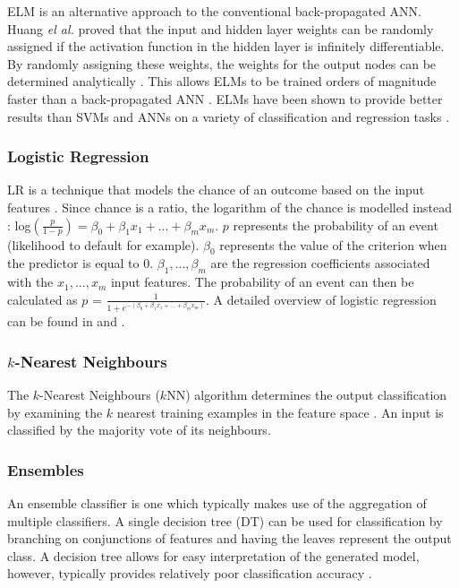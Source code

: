 \documentclass{sig-alternate-05-2015}
\begin{document}
	ELM is an alternative approach to the conventional back-propagated ANN. Huang \textit{el al.} \cite{Huang2006489} proved that the input and hidden layer weights can be randomly assigned if the activation function in the hidden layer is infinitely differentiable. By randomly assigning these weights, the weights for the output nodes can be determined analytically \cite{Huang2006489}. This allows ELMs to be trained orders of magnitude faster than a back-propagated ANN \cite{6035797, Huang2006489}. ELMs have been shown to provide better results than SVMs and ANNs on a variety of classification and regression tasks \cite{6035797, Huang2006489}.
	
	\subsubsection{Logistic Regression}
	LR is a technique that models the chance of an outcome based on the input features \cite{doi:10.11613/BM.2014.003}. Since chance is a ratio, the logarithm of the chance is modelled instead \cite{doi:10.11613/BM.2014.003}:
	log$(\frac{p}{1 - p}) = \beta_0 + \beta_1 x_1 + ... + \beta_m x_m$. $p$ represents the probability of an event (likelihood to default for example). $\beta_0$ represents the value of the criterion when the predictor is equal to 0. $\beta_1, ..., \beta_m$ are the regression coefficients associated with the $x_1, ..., x_m$ input features. The probability of an event can then be calculated as $p$ = $\frac{1}{1 + e^{-(\beta_0 + \beta_1 x_1 + ... + \beta_m x_m)}}$. A detailed overview of logistic regression can be found in \cite{Mood01022010} and \cite{doi:10.11613/BM.2014.003}.
	
	\subsubsection{$k$-Nearest Neighbours}
	The $k$-Nearest Neighbours ($k$NN) algorithm determines the output classification by examining the $k$ nearest training examples in the feature space \cite{6313426}. An input is classified by the majority vote of its neighbours.
	
	\subsubsection{Ensembles}
	An ensemble classifier is one which typically makes use of the aggregation of multiple classifiers. A single decision tree (DT) can be used for classification by branching on conjunctions of features and having the leaves represent the output class. A decision tree allows for easy interpretation of the generated model, however, typically provides relatively poor classification accuracy \cite{doi:10.1021/ci034160g}. 
	
\end{document}
